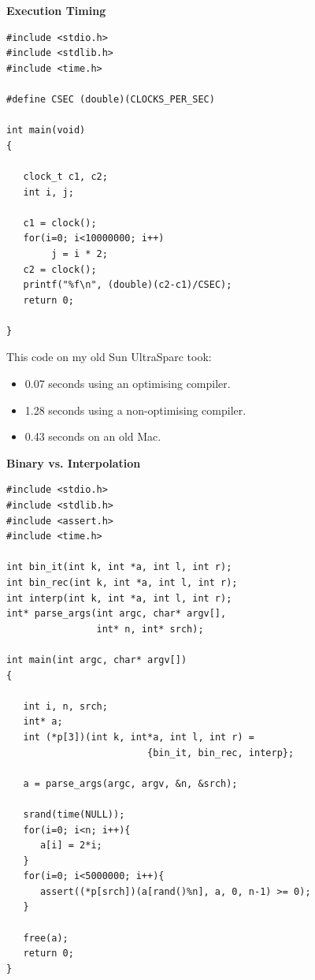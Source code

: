 \documentclass[a4,portraitt]{slides}
\begin{document}
\newpage
{\samepage
\begin{center}
{\Large{\bf Execution Timing}}
\end{center}
{\small
\begin{verbatim}
#include <stdio.h>
#include <stdlib.h>
#include <time.h>

#define CSEC (double)(CLOCKS_PER_SEC)

int main(void)
{

   clock_t c1, c2;
   int i, j;

   c1 = clock();
   for(i=0; i<10000000; i++)
        j = i * 2;
   c2 = clock();
   printf("%f\n", (double)(c2-c1)/CSEC);
   return 0;

}
\end{verbatim}
This code on my old Sun UltraSparc took:
\begin{itemize}
\item 0.07 seconds using an optimising compiler.
\item 1.28 seconds using a non-optimising compiler.
\item 0.43 seconds on an old Mac.
\end{itemize}
}}

\newpage
{\samepage
\begin{center}
{\Large{\bf Binary vs. Interpolation}}
\end{center}
{\small
\begin{verbatim}
#include <stdio.h>
#include <stdlib.h>
#include <assert.h>
#include <time.h>

int bin_it(int k, int *a, int l, int r);
int bin_rec(int k, int *a, int l, int r);
int interp(int k, int *a, int l, int r);
int* parse_args(int argc, char* argv[],
                int* n, int* srch);

int main(int argc, char* argv[])
{

   int i, n, srch;
   int* a;
   int (*p[3])(int k, int*a, int l, int r) =
                         {bin_it, bin_rec, interp};

   a = parse_args(argc, argv, &n, &srch);

   srand(time(NULL));
   for(i=0; i<n; i++){
      a[i] = 2*i;
   }
   for(i=0; i<5000000; i++){
      assert((*p[srch])(a[rand()%n], a, 0, n-1) >= 0);
   }

   free(a);
   return 0;
}
\end{verbatim}
}}
\end{document}
